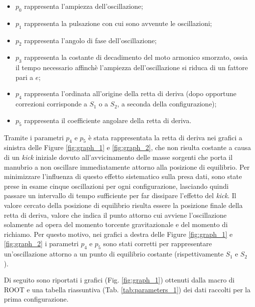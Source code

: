 \documentclass{article}
\begin{document}
\begin{itemize}
    \item$p_0$ rappresenta l'ampiezza dell'oscillazione;
    \item$p_1$ rappresenta la pulsazione con cui sono avvenute le oscillazioni;
    \item $p_2$ rappresenta l'angolo di fase dell'oscillazione;
    \item$p_3$ rappresenta la costante di decadimento del moto armonico smorzato, ossia il tempo necessario affinchè l'ampiezza dell'oscillazione si riduca di un fattore pari a $e$;
    \item $p_4$ rappresenta l'ordinata all'origine della retta di deriva (dopo opportune correzioni corrisponde a $S_1$ o a $S_2$, a seconda della configurazione);
    \item $p_5$ rappresenta il coefficiente angolare della retta di deriva.
\end{itemize}
Tramite i parametri $p_4$ e $p_5$ è stata rappresentata la retta di deriva nei grafici a sinistra delle Figure \ref{fig:graph_1} e \ref{fig:graph_2}, che non risulta costante a causa di un \textit{kick} iniziale dovuto all'avvicinamento delle masse sorgenti che porta il manubrio a non oscillare immediatamente attorno alla posizione di equilibrio. Per minimizzare l'influenza di questo effetto sistematico sulla presa dati, sono state prese in esame cinque oscillazioni per ogni configurazione, lasciando quindi passare un intervallo di tempo sufficiente per far dissipare l'effetto del \textit{kick}. Il valore cercato della posizione di equilibrio risulta essere la posizione finale della retta di deriva, valore che indica il punto attorno cui avviene l'oscillazione solamente ad opera del momento torcente gravitazionale e del momento di richiamo. Per questo motivo, nei grafici a destra delle Figure \ref{fig:graph_1} e \ref{fig:graph_2} i parametri $p_4$ e $p_5$ sono stati corretti per rappresentare un'oscillazione attorno a un punto di equilibrio costante (rispettivamente $S_1$ e $S_2$).

Di seguito sono riportati i grafici (Fig. \ref{fig:graph_1}) ottenuti dalla macro di ROOT e una tabella riassuntiva (Tab. \ref{tab:parameters_1}) dei dati raccolti per la prima configurazione.
\end{document}
